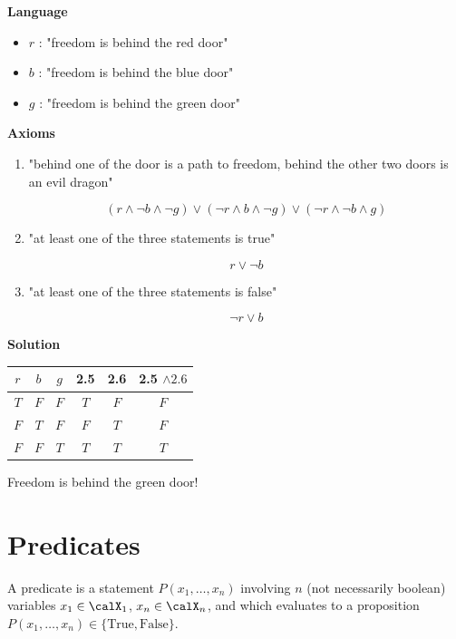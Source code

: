 \begin{sol}
\textbf{Language}
\begin{itemize}
  \item $r$ : "freedom is behind the red door"
  \item $b$ : "freedom is behind the blue door"
  \item $g$ : "freedom is behind the green door"
\end{itemize}

\textbf{Axioms}
\begin{enumerate}
  \item "behind one of the door is a path to freedom, behind the other two doors is an evil dragon"


\begin{equation*}
(r \wedge \neg b \wedge \neg g) \vee(\neg r \wedge b \wedge \neg g) \vee(\neg r \wedge \neg b \wedge g) \tag{2.4}
\end{equation*}


  \item "at least one of the three statements is true"


\begin{equation*}
r \vee \neg b \tag{2.5}
\end{equation*}


  \item "at least one of the three statements is false"


\begin{equation*}
\neg r \vee b \tag{2.6}
\end{equation*}
\end{enumerate}


\textbf{Solution}
\begin{center}
\begin{tabular}{|c|c|c||c|c|c|}
\hline
$r$ & $b$ & $g$ & 2.5 & 2.6 & 2.5 $\wedge 2.6$ \\
\hline\hline
$T$ & $F$ & $F$ & $T$ & $F$ & $F$ \\
$F$ & $T$ & $F$ & $F$ & $T$ & $F$ \\
$F$ & $F$ & $T$ & $T$ & $T$ & $T$ \\
\hline
\end{tabular}
\end{center}

Freedom is behind the green door!
\end{sol}


\section{Predicates}
\begin{definition}[Predicates]
  A predicate is a statement $P(x_1, \dots, x_n)$ involving $n$ (not necessarily boolean) variables $x_1 \in \calX_1$, $x_n \in \calX_n$, and which evaluates to a proposition $P(x_1, \dots, x_n) \in \{\text{True}, \text{False}\}$.
\end{definition}


